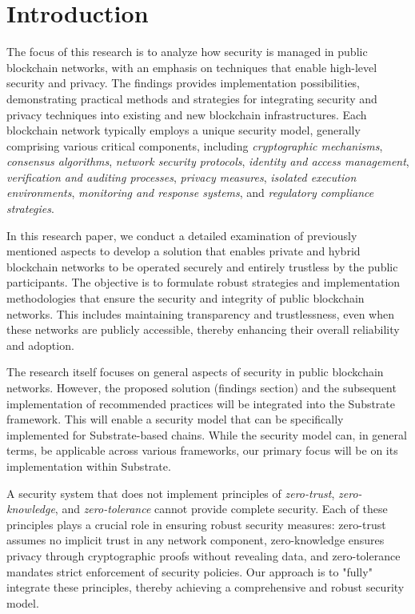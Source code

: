 \section{Introduction}
The focus of this research is to analyze how security is managed in public blockchain networks, with an emphasis on techniques that enable high-level security and privacy. The findings provides implementation possibilities, demonstrating practical methods and strategies for integrating security and privacy techniques into existing and new blockchain infrastructures. Each blockchain network typically employs a unique security model, generally comprising various critical components, including \textit{cryptographic mechanisms}, \textit{consensus algorithms}, \textit{network security protocols}, \textit{identity and access management}, \textit{verification and auditing processes}, \textit{privacy measures}, \textit{isolated execution environments}, \textit{monitoring and response systems}, and \textit{regulatory compliance strategies}.

In this research paper, we conduct a detailed examination of previously mentioned aspects to develop a solution that enables private and hybrid blockchain networks to be operated securely and entirely trustless by the public participants. The objective is to formulate robust strategies and implementation methodologies that ensure the security and integrity of public blockchain networks. This includes maintaining transparency and trustlessness, even when these networks are publicly accessible, thereby enhancing their overall reliability and adoption.

The research itself focuses on general aspects of security in public blockchain networks. However, the proposed solution (findings section) and the subsequent implementation of recommended practices will be integrated into the Substrate framework. This will enable a security model that can be specifically implemented for Substrate-based chains. While the security model can, in general terms, be applicable across various frameworks, our primary focus will be on its implementation within Substrate.

A security system that does not implement principles of \textit{zero-trust}, \textit{zero-knowledge}, and \textit{zero-tolerance} cannot provide complete security. Each of these principles plays a crucial role in ensuring robust security measures: zero-trust assumes no implicit trust in any network component, zero-knowledge ensures privacy through cryptographic proofs without revealing data, and zero-tolerance mandates strict enforcement of security policies. Our approach is to "fully" integrate these principles, thereby achieving a comprehensive and robust security model.

